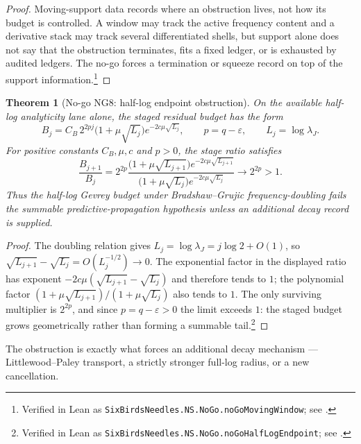 \documentclass[11pt]{article}
\newcommand{\eps}{\varepsilon}
\newcommand{\lambdaJ}{\lambda_J}
\newtheorem{theorem}{Theorem}[section]
\theoremstyle{definition}
\begin{document}
\begin{proof}
Moving-support data records where an obstruction lives, not how its
budget is controlled.  A window may track the active frequency content
and a derivative stack may track several differentiated shells, but
support alone does not say that the obstruction terminates, fits a
fixed ledger, or is exhausted by audited ledgers.  The no-go forces a
termination or squeeze record on top of the support information.\footnote{Verified in Lean as \texttt{SixBirdsNeedles.NS.NoGo.noGoMovingWindow}; see .}
\end{proof}

\begin{theorem}[No-go NG8: half-log endpoint obstruction]
\label{thm:ns:no-go-half-log-endpoint}
On the available half-log analyticity lane alone, the staged residual
budget has the form
\[
  B_j
  =
  C_B\,2^{2pj}\bigl(1+\mu\sqrt{L_j}\bigr)
  e^{-2c\mu\sqrt{L_j}},
  \qquad
  p=q-\eps,\qquad
  L_j=\log\lambdaJ .
\]
For positive constants \(C_B,\mu,c\) and \(p>0\), the stage ratio
satisfies
\[
  \frac{B_{j+1}}{B_j}
  =
  2^{2p}
  \frac{\bigl(1+\mu\sqrt{L_{j+1}}\bigr)
        e^{-2c\mu\sqrt{L_{j+1}}}}
       {\bigl(1+\mu\sqrt{L_j}\bigr)
        e^{-2c\mu\sqrt{L_j}}}
  \longrightarrow 2^{2p}>1 .
\]
Thus the half-log Gevrey budget under Bradshaw--Grujic
frequency-doubling fails the summable predictive-propagation hypothesis
unless an additional decay record is supplied.
\end{theorem}

\begin{proof}
The doubling relation gives
\(L_j=\log\lambdaJ=j\log 2+O(1)\), so
\(\sqrt{L_{j+1}}-\sqrt{L_j}=O(L_j^{-1/2})\to 0\).  The exponential
factor in the displayed ratio has exponent
\(-2c\mu(\sqrt{L_{j+1}}-\sqrt{L_j})\) and therefore tends to \(1\); the
polynomial factor \((1+\mu\sqrt{L_{j+1}})/(1+\mu\sqrt{L_j})\) also
tends to \(1\).  The only surviving multiplier is \(2^{2p}\), and
since \(p=q-\eps>0\) the limit exceeds \(1\): the staged budget grows
geometrically rather than forming a summable tail.\footnote{Verified in Lean as \texttt{SixBirdsNeedles.NS.NoGo.noGoHalfLogEndpoint}; see .}
\end{proof}

\noindent
The obstruction is exactly what forces an additional decay mechanism
--- Littlewood--Paley transport, a strictly stronger full-log radius,
or a new cancellation.
\end{document}
